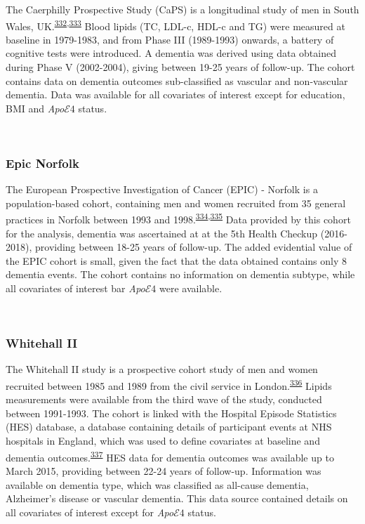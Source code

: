 \documentclass[a4paper, twoside]{templates/ociamthesis}
\begin{document}
The Caerphilly Prospective Study (CaPS) is a longitudinal study of men in South Wales, UK.\textsuperscript{\protect\hyperlink{ref-zotero-15398}{332},\protect\hyperlink{ref-elwood2013}{333}} Blood lipids (TC, LDL-c, HDL-c and TG) were measured at baseline in 1979-1983, and from Phase III (1989-1993) onwards, a battery of cognitive tests were introduced. A dementia was derived using data obtained during Phase V (2002-2004), giving between 19-25 years of follow-up. The cohort contains data on dementia outcomes sub-classified as vascular and non-vascular dementia. Data was available for all covariates of interest except for education, BMI and \emph{Apo}\(\mathcal{E}4\) status.

~

\hypertarget{epic-norfolk}{%
\subsubsection{Epic Norfolk}\label{epic-norfolk}}

The European Prospective Investigation of Cancer (EPIC) - Norfolk is a population-based cohort, containing men and women recruited from 35 general practices in Norfolk between 1993 and 1998.\textsuperscript{\protect\hyperlink{ref-riboli1997}{334},\protect\hyperlink{ref-riboli2002}{335}} Data provided by this cohort for the analysis, dementia was ascertained at at the 5th Health Checkup (2016-2018), providing between 18-25 years of follow-up. The added evidential value of the EPIC cohort is small, given the fact that the data obtained contains only 8 dementia events. The cohort contains no information on dementia subtype, while all covariates of interest bar \emph{Apo}\(\mathcal{E}4\) were available.

~

\hypertarget{whitehall-ii}{%
\subsubsection{Whitehall II}\label{whitehall-ii}}

The Whitehall II study is a prospective cohort study of men and women recruited between 1985 and 1989 from the civil service in London.\textsuperscript{\protect\hyperlink{ref-marmot2005}{336}} Lipids measurements were available from the third wave of the study, conducted between 1991-1993. The cohort is linked with the Hospital Episode Statistics (HES) database, a database containing details of participant events at NHS hospitals in England, which was used to define covariates at baseline and dementia outcomes.\textsuperscript{\protect\hyperlink{ref-zotero-15403}{337}} HES data for dementia outcomes was available up to March 2015, providing between 22-24 years of follow-up. Information was available on dementia type, which was classified as all-cause dementia, Alzheimer's disease or vascular dementia. This data source contained details on all covariates of interest except for \emph{Apo}\(\mathcal{E}4\) status.
\end{document}
